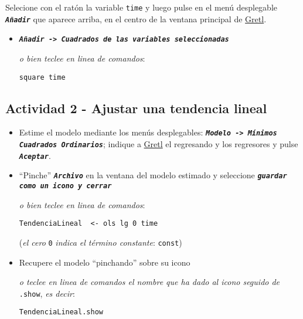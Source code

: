 \documentclass[11pt]{article}
\begin{document}
Selecione con el ratón la variable \texttt{time} y luego pulse en el menú desplegable \textbf{\emph{\texttt{Añadir}}} que aparece arriba, en el centro de la
ventana principal de \href{https://gretl.sourceforge.net/es.html}{Gretl}.
\begin{itemize}
\item \textbf{\emph{\texttt{Añadir -> Cuadrados de las variables seleccionadas}}}

{\vspace{0pt} \footnotesize \color{gray!70!black}
\emph{o bien teclee en linea de comandos}: 
\begin{verbatim}
square time
\end{verbatim}
}
\end{itemize}

\vspace{-3pt}

\subsection{Actividad 2 - Ajustar una tendencia lineal}
\label{sec:org2056c6b}
\begin{itemize}
\item Estime el modelo mediante los menús desplegables: \textbf{\emph{\texttt{Modelo ->
  Mínimos Cuadrados Ordinarios}}}; indique a \href{https://gretl.sourceforge.net/es.html}{Gretl} el regresando y los
regresores y pulse \textbf{\emph{\texttt{Aceptar}}}.

\item ``Pinche'' \textbf{\emph{\texttt{Archivo}}} en la ventana del modelo estimado y
seleccione \textbf{\emph{\texttt{guardar como un icono y cerrar}}}

{\vspace{1pt} \footnotesize \color{gray!70!black} \color{gray!70!black}
\emph{o bien teclee en linea de comandos}:
\begin{verbatim}
TendenciaLineal  <- ols lg 0 time
\end{verbatim}
(\emph{el cero} \texttt{0} \emph{indica el término constante}: \texttt{const})
}

\item Recupere el modelo ``pinchando'' sobre su icono

{\vspace{1pt} \footnotesize \color{gray!70!black} \color{gray!70!black}
\emph{o teclee en linea de comandos el nombre que ha dado al icono
seguido de} \texttt{.show}, \emph{es decir}:
\begin{verbatim}
TendenciaLineal.show
\end{verbatim}
}
\end{itemize}
\end{document}
